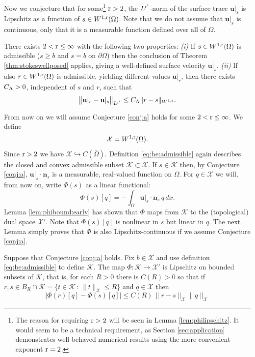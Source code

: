 \documentclass[hidelinks,onefignum,onetabnum,final]{siamart220329}  %
\newcommand{\bn}{\mathbf{n}}
\newcommand{\bu}{\mathbf{u}}
\newcommand{\cK}{\mathcal{K}}
\newcommand{\cX}{\mathcal{X}}
\newcommand{\rr}{{\text{\textnormal{r}}}}
\newcommand{\CA}{C_\text{\textnormal{A}}}
\begin{document}
Now we conjecture that for some\footnote{The reason for requiring $\rr>2$ will be seen in Lemma \ref{lem:philipschitz}.  It would seem to be a technical requirement, as Section \ref{sec:application} demonstrates well-behaved numerical results using the more convenient exponent $\rr=2$.} $\rr>2$, the $L^{\rr'}$-norm of the surface trace $\bu|_s$ is Lipschitz as a function of $s \in W^{1,\rr}(\Omega)$.  Note that we do not assume that $\bu|_s$ is continuous, only that it is a measurable function defined over all of $\Omega$.

\begin{conjecture} \label{conj:a}  There exists $2 < \rr \le \infty$ with the following two properties:  \emph{(i)} If $s\in W^{1,\rr}(\Omega)$ is admissible ($s\ge b$ and $s=b$ on $\partial\Omega$) then the conclusion of Theorem \ref{thm:stokeswellposed} applies, giving a well-defined surface velocity $\bu|_s$.  \emph{(ii)} If also $r\in W^{1,\rr}(\Omega)$ is admissible, yielding different values $\bu|_r$, then there exists $\CA>0$, independent of $s$ and $r$, such that
\begin{equation}
\big\|\bu|_r - \bu|_s\big\|_{L^{\rr'}} \le \CA \|r-s\|_{W^{1,\rr}}. \label{eq:ulipschitz}
\end{equation}
\end{conjecture}

From now on we will assume Conjecture \ref{conj:a} holds for some $2 < \rr \le \infty$.  We define
\begin{equation}
\cX = W^{1,\rr}(\Omega). \label{eq:defineX}
\end{equation}
Since $\rr>2$ we have $\cX \hookrightarrow C(\bar\Omega)$.  Definition \eqref{eq:be:admissible} again describes the closed and convex admissible subset $\cK \subset \cX$.  If $s\in\cK$ then, by Conjecture \ref{conj:a}, $\bu|_s\cdot\bn_s$ is a measurable, real-valued function on $\Omega$.  For $q\in\cX$ we will, from now on, write $\Phi(s)$ as a linear functional:
\begin{equation}
\Phi(s)[q] = -\int_\Omega \bu|_s\cdot\bn_s\,q\,dx. \label{eq:definePhi}
\end{equation}
Lemma \ref{lem:phibound:early} has shown that $\Phi$ maps from $\cK$ to the (topological) dual space $\cX'$.  Note that $\Phi(s)[q]$ is nonlinear in $s$ but linear in $q$.  The next Lemma simply proves that $\Phi$ is also Lipschitz-continuous if we assume Conjecture \ref{conj:a}.

\begin{lemma} \label{lem:philipschitz}  Suppose that Conjecture \ref{conj:a} holds.  Fix $b \in \cX$ and use definition \eqref{eq:be:admissible} to define $\cK$.  The map $\Phi:\cK\to\cX'$ is Lipschitz on bounded subsets of $\cK$, that is, for each $R>0$ there is $C(R)>0$ so that if $r,s\in B_R \cap \cK = \{t\in \cK\,:\,\|t\|_{\cX} \le R\}$ and $q\in\cX$ then
\begin{equation}
\Big|\Phi(r)[q] - \Phi(s)[q]\Big| \le C(R)\, \|r-s\|_{\cX} \|q\|_{\cX}  \label{eq:philipschitz}
\end{equation}
\end{lemma}
\end{document}
